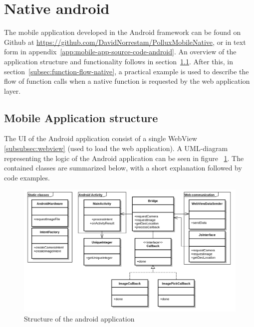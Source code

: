 \section{Native android} \label{sec:native-android}
The mobile application developed in the Android framework can be found on Github at \url{https://github.com/DavidNorrestam/PolluxMobileNative}, or in text form in appendix~\ref{app:mobile-app-source-code-android}. An overview of the application structure and functionality follows in section~\ref{subsec:mobile-application-structure-native}. After this, in section~\ref{subsec:function-flow-native}, a practical example is used to describe the flow of function calls when a native function is requested by the web application layer.


\subsection{Mobile Application structure} \label{subsec:mobile-application-structure-native}
The UI of the Android application consist of a single WebView \ref{subsubsec:webview} (used to load the web application). A UML-diagram representing the logic of the Android application can be seen in figure ~\ref{fig:nativeuml}. The contained classes are summarized below, with a short explanation followed by code examples.

\begin{figure}
	\centering
    \includegraphics[width=150mm,natwidth=1000,natheight=750]{./img/polluxuml.png}
    \caption{Structure of the android application}
    \label{fig:nativeuml}
\end{figure}

